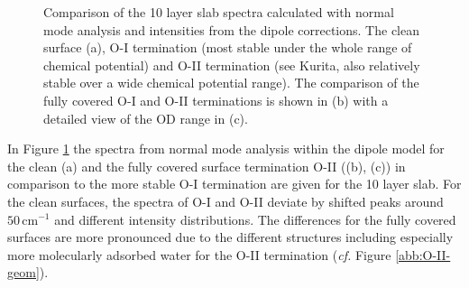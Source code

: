 \documentclass[11pt,DIV=13,BCOR=5mm,a4paper,headinclude]{scrbook}
\begin{document}
\begin{figure}[!h]
 \centering
 \quad
 \quad
 \caption{Comparison of the 10 layer slab spectra calculated with normal mode analysis and intensities from the dipole corrections.
The clean surface (a), O-I termination (most stable under the whole range of chemical potential) and O-II termination (see Kurita\cite{kuri10}, also relatively stable over a wide chemical potential range).
The comparison of the fully covered O-I and O-II terminations is shown in (b) with a detailed view of the OD range in (c).}
 \label{abb:comp_O-I-O-II}
\end{figure}
In Figure \ref{abb:comp_O-I-O-II} the spectra from normal mode analysis within the dipole model for the clean (a) and the fully covered surface termination O-II ((b), (c)) in comparison to the more stable O-I termination are given for the 10 layer slab.
For the clean surfaces, the spectra of O-I and O-II deviate by shifted peaks around $50\,$cm$^{-1}$ and different intensity distributions.
The differences for the fully covered surfaces are more pronounced due to the different structures including especially more molecularly adsorbed water for the O-II termination (\textit{cf.} Figure \ref{abb:O-II-geom}).
\end{document}
